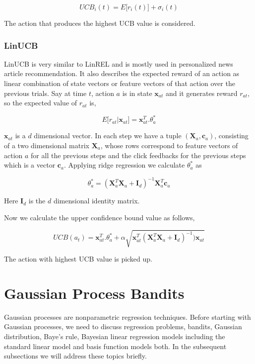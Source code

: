 \documentclass[english]{tktltiki}
\begin{document}
\begin{equation}
UCB_i(t) = E\big[r_i(t)\big] + \sigma_i(t)
\end{equation}

The action that produces the highest UCB value is considered.


\subsubsection{LinUCB}

LinUCB \cite{linucb} is very similar to LinREL and is mostly used in personalized news article recommendation. It also describes the expected reward of an action as linear combination of state vectors or feature vectors of that action over the previous trials. Say at time $t$, action $a$ is in state $\mathbf{x}_{at}$ and it generates reward $r_{at}$, so the expected value of $r_{at}$ is,

\begin{equation}
E\big[r_{at}|\mathbf{x}_{at}\big] = \mathbf{x}_{at}^T . \theta_a^*
\end{equation}

$\mathbf{x}_{at}$ is a $d$ dimensional vector. In each step we have a tuple $(\mathbf{X}_a, \mathbf{c}_a)$, consisting of a two dimensional matrix $\mathbf{X}_a$, whose rows correspond to feature vectors of action $a$ for all the previous steps and the click feedbacks for the previous steps which is a vector $\mathbf{c}_a$. Applying ridge regression we calculate $\theta_a^*$ as

\begin{equation}
\theta_a^* = (\mathbf{X}_a^T \mathbf{X}_a + \mathbf{I}_d)^{-1} \mathbf{X}_a^T \mathbf{c}_a
\end{equation}

Here $\mathbf{I}_d$ is the $d$ dimensional identity matrix.

Now we calculate the upper confidence bound value as follows,

\begin{equation}
UCB(a_t) = \mathbf{x}_{at}^T . \theta_a^* + \alpha \sqrt{\mathbf{x}_{at}^T (\mathbf{X}_a^T \mathbf{X}_a + \mathbf{I}_d)^{-1}) \mathbf{x}_{at}}
\end{equation}

The action with highest UCB value is picked up.

\section{Gaussian Process Bandits}
\label{sec:gpb}
Gaussian processes are nonparametric regression techniques. Before starting with Gaussian processes, we need to discuss regression problems, bandits, Gaussian distribution, Baye's rule, Bayesian linear regression models including the standard linear model and basis function models both. In the subsequent subsections we will address these topics briefly.
\end{document}
